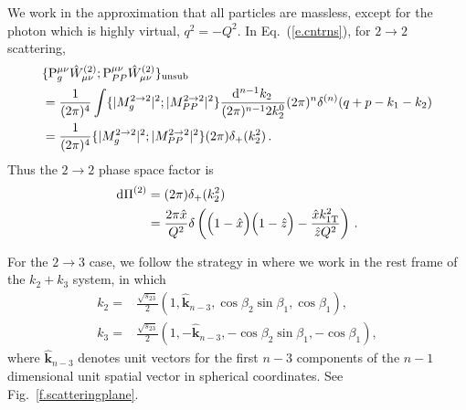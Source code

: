 \documentclass[prd,preprintnumbers,nofootinbib,superscriptaddress,onecolumn,preprint]{revtex4-1}
\newcommand\3[1]{\boldsymbol{#1}}
\newcommand{\Tscsq}[2]{#1^2_{#2\text{T}}}
\newcommand{\contractor}[1]{\ensuremath{{\rm P}}_{#1}}
\newcommand{\ps}{\ensuremath{\Pi}}
\newcommand{\eref}[1]{Eq.~(\ref{e.#1})}
\newcommand{\fref}[1]{Fig.~\ref{f.#1}}
\begin{document}
We work in the approximation that all particles are massless, except
for the photon which is highly virtual, $q^2=-Q^2$. In
\eref{cntrns}, for $2 \to 2$ scattering,
%
\begin{align}
&{}  
 \{ \contractor{g}^{\mu \nu}  \hat{W}^{(2)}_{\mu\nu}; 
    \contractor{PP}^{\mu \nu} \hat{W}^{(2)}_{\mu\nu}\}_{{\rm unsub}} \nonumber \\
&{}=  
  \frac{1}{(2 \pi)^4} \int 
  \{\lvert M^{2\to 2}_g\rvert^2;\lvert M^{2\to 2}_{PP}\rvert^2\} 
  \frac{\diff{^{n-1} k_2}{} }{(2 \pi)^{n-1} 2 k_2^0} 
  (2 \pi)^{n} \delta^{(n)}(q + p - k_1 - k_2) \nonumber \\
&{}=
  \frac{1}{(2 \pi)^4} \{\lvert M^{2\to 2}_g\rvert^2;\lvert M^{2\to 2}_{PP}\rvert^2\}  
  (2 \pi)\delta_+(k_2^2) \, .
\end{align}
%
Thus the $2 \to 2$ phase space factor is
%
\begin{align}
\diff{\ps}^{(2)}  &{}= (2 \pi) \delta_+(k_2^2)  \, \nonumber \\
                  &{}= \frac{2 \pi\hat{x}}{Q^2} 
\delta\left( \Bigl(1 - \hat{x} \Bigr)\Bigl( 1 - \hat{z} \Bigr) - \frac{\hat{x} \Tscsq{k}{1} }{\hat{z} Q^2} \right) \, . \label{e.2to2ps}
\end{align} 
%

For the $2 \to 3$ case,
we follow the strategy in \cite{Ellis:1979sj,Gordon:1993qc} where 
we work in the rest frame of the $k_2+k_3$
system, in which
%
\begin{align}
k_2=&\frac{\sqrt{s_{23}}}{2}
  (1,\bm{\hat{k}}_{n-3},\cos\beta_2\sin\beta_1,\cos\beta_1),
  \label{e.defk2} \\
k_3=&\frac{\sqrt{s_{23}}}{2}
  (1,-\bm{\hat{k}}_{n-3},-\cos\beta_2\sin\beta_1,-\cos\beta_1)
  \label{e.defk3},
\end{align}
where
$\bm{\hat{k}}_{n-3}$ denotes unit vectors for the first
$n-3$ components of the $n-1$ dimensional unit spatial vector in
spherical coordinates. See \fref{scatteringplane}. 
\end{document}
